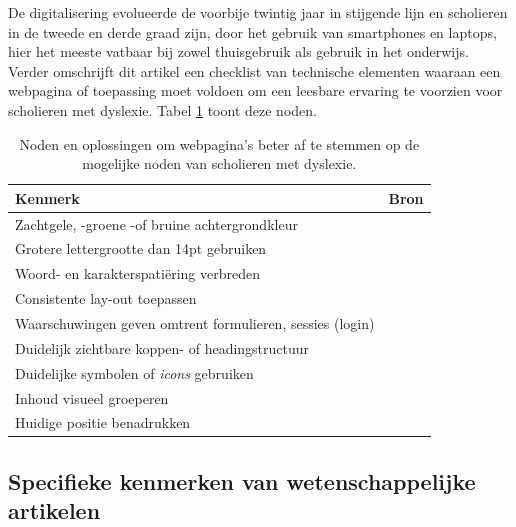 \medspace

De digitalisering evolueerde de voorbije twintig jaar in stijgende lijn en scholieren in de tweede en derde graad zijn, door het gebruik van smartphones en laptops, hier het meeste vatbaar bij zowel thuisgebruik als gebruik in het onderwijs. Verder omschrijft dit artikel een checklist van technische elementen waaraan een webpagina of toepassing moet voldoen om een leesbare ervaring te voorzien voor scholieren met dyslexie. Tabel \ref{table:dyslexia-necessaries} toont deze noden.

\begin{center}
		\begin{table}[H]
	\begin{tabular}{ | m{8cm} | m{7cm} | } 
		\hline
		Kenmerk & Bron \\
		\hline
		Zachtgele, -groene -of bruine achtergrondkleur 	& \textcite{Santana2012, Rello2017} \\ \hline
		Grotere lettergrootte dan 14pt gebruiken		& \autocite{Rello2015} \\ \hline
		
		Woord- en karakterspatiëring verbreden 			& \textcite{Santana2012, Rello2013b} \\ \hline
		Consistente lay-out toepassen					& \autocite{Rello2015, Fernando2021} \\  \hline
		Waarschuwingen geven omtrent formulieren, sessies (login) & \\ \hline
		Duidelijk zichtbare koppen- of headingstructuur & \autocite{Rello2012a} \\ \hline
		Duidelijke symbolen of \textit{icons} gebruiken & \autocite{Rello2012} \\ \hline
		Inhoud visueel groeperen 						& \autocite{Rello2015, Fernando2021}\\ \hline
		Huidige positie benadrukken 					& \autocite{Fernando2021} \\ \hline
		
	\end{tabular}
	\caption{Noden en oplossingen om webpagina's beter af te stemmen op de mogelijke noden van scholieren met dyslexie.}
	\label{table:dyslexia-necessaries}
	\end{table}
\end{center}

\subsection{Specifieke kenmerken van wetenschappelijke artikelen}

